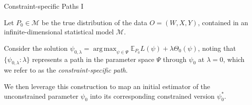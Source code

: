 \documentclass[12pt,t,handout]{beamer}
\newcommand{\E}{\mathbb{E}}
\DeclareMathOperator*{\argmax}{arg\,max}
\begin{document}

\begin{frame}[c]{Constraint-specific Paths I}

\begin{center}

Let $P_0 \in \mathcal{M}$ be the true distribution of the data $O = (W, X, Y)$,
contained in an infinite-dimensional statistical model $\mathcal{M}$.

\vspace{1em}

Consider the solution $\psi_{0, \lambda} = \argmax_{\psi \in \Psi}
\E_{P_0}L(\psi) + \lambda \Theta_0(\psi)$, noting that $\{\psi_{0, \lambda} :
\lambda\}$ represents a path in the parameter space $\Psi$ through $\psi_0$ at
$\lambda = 0$, which we refer to as the \textit{constraint-specific path}.

\vspace{1em}

We then leverage this construction to map an initial estimator of the
unconstrained parameter $\psi_0$ into its corresponding constrained version
$\psi_0^*$.
\end{center}

\note{
}

\end{frame}

\end{document}
